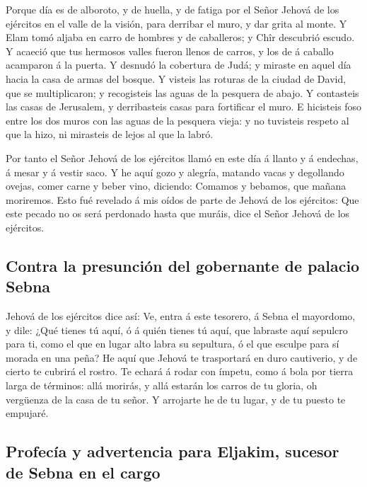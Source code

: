  Porque día es de alboroto, y de huella, y de fatiga por
el Señor Jehová de los ejércitos en el valle de la visión, para derribar
el muro, y dar grita al monte.  Y Elam tomó aljaba en
carro de hombres y de caballeros; y Chîr descubrió escudo.
 Y acaeció que tus hermosos valles fueron llenos de
carros, y los de á caballo acamparon á la puerta.  Y
desnudó la cobertura de Judá; y miraste en aquel día hacia la casa de
armas del bosque.  Y visteis las roturas de la ciudad de
David, que se multiplicaron; y recogisteis las aguas de la pesquera de
abajo.  Y contasteis las casas de Jerusalem, y
derribasteis casas para fortificar el muro.  E hicisteis
foso entre los dos muros con las aguas de la pesquera vieja: y no
tuvisteis respeto al que la hizo, ni mirasteis de lejos al que la labró.

 Por tanto el Señor Jehová de los ejércitos llamó en este
día á llanto y á endechas, á mesar y á vestir saco.  Y he
aquí gozo y alegría, matando vacas y degollando ovejas, comer carne y
beber vino, diciendo: Comamos y bebamos, que mañana moriremos.
 Esto fué revelado á mis oídos de parte de Jehová de los
ejércitos: Que este pecado no os será perdonado hasta que muráis, dice
el Señor Jehová de los ejércitos.

\hypertarget{contra-la-presunciuxf3n-del-gobernante-de-palacio-sebna}{%
\subsection{Contra la presunción del gobernante de palacio
Sebna}\label{contra-la-presunciuxf3n-del-gobernante-de-palacio-sebna}}

 Jehová de los ejércitos dice así: Ve, entra á este
tesorero, á Sebna el mayordomo, y dile:  ¿Qué tienes tú
aquí, ó á quién tienes tú aquí, que labraste aquí sepulcro para ti, como
el que en lugar alto labra su sepultura, ó el que esculpe para sí morada
en una peña?  He aquí que Jehová te trasportará en duro
cautiverio, y de cierto te cubrirá el rostro.  Te echará
á rodar con ímpetu, como á bola por tierra larga de términos: allá
morirás, y allá estarán los carros de tu gloria, oh vergüenza de la casa
de tu señor.  Y arrojarte he de tu lugar, y de tu puesto
te empujaré.

\hypertarget{profecuxeda-y-advertencia-para-eljakim-sucesor-de-sebna-en-el-cargo}{%
\subsection{Profecía y advertencia para Eljakim, sucesor de Sebna en el
cargo}\label{profecuxeda-y-advertencia-para-eljakim-sucesor-de-sebna-en-el-cargo}}

